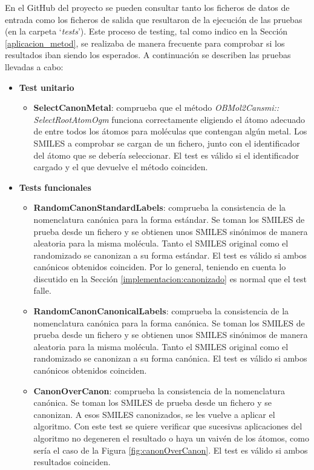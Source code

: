 En el GitHub del proyecto se pueden consultar tanto los ficheros de datos de entrada como los ficheros de salida que resultaron de la ejecución de las pruebas (en la carpeta `\textit{tests}'). Este proceso de testing, tal como indico en la Sección \ref{aplicacion_metod}, se realizaba de manera frecuente para comprobar si los resultados iban siendo los esperados. A continuación se describen las pruebas llevadas a cabo:

\begin{itemize}
    \item \textbf{Test unitario}
    \begin{itemize}
        \item \textbf{SelectCanonMetal}: comprueba que el método \textit{OBMol2Cansmi:: SelectRootAtomOgm} funciona correctamente eligiendo el átomo adecuado de entre todos los átomos para moléculas que contengan algún metal. Los SMILES a comprobar se cargan de un fichero, junto con el identificador del átomo que se debería seleccionar. El test es válido si el identificador cargado y el que devuelve el método coinciden.
    \end{itemize}

    \item \textbf{Tests funcionales}
    \begin{itemize}
        \item \textbf{RandomCanonStandardLabels}: comprueba la consistencia de la nomenclatura canónica para la forma estándar. Se toman los SMILES de prueba desde un fichero y se obtienen unos SMILES sinónimos de manera aleatoria para la misma molécula. Tanto el SMILES original como el randomizado se canonizan a su forma estándar. El test es válido si ambos canónicos obtenidos coinciden. Por lo general, teniendo en cuenta lo discutido en la Sección \ref{implementacion:canonizado} es normal que el test falle.

        \item \textbf{RandomCanonCanonicalLabels}: comprueba la consistencia de la nomenclatura canónica para la forma canónica. Se toman los SMILES de prueba desde un fichero y se obtienen unos SMILES sinónimos de manera aleatoria para la misma molécula. Tanto el SMILES original como el randomizado se canonizan a su forma canónica. El test es válido si ambos canónicos obtenidos coinciden.
    
        \item \textbf{CanonOverCanon}: comprueba la consistencia de la nomenclatura canónica. Se toman los SMILES de prueba desde un fichero y se canonizan. A esos SMILES canonizados, se les vuelve a aplicar el algoritmo. Con este test se quiere verificar que sucesivas aplicaciones del algoritmo no degeneren el resultado o haya un vaivén de los átomos, como sería el caso de la Figura \ref{fig:canonOverCanon}. El test es válido si ambos resultados coinciden.


\end{itemize}
\end{itemize}

